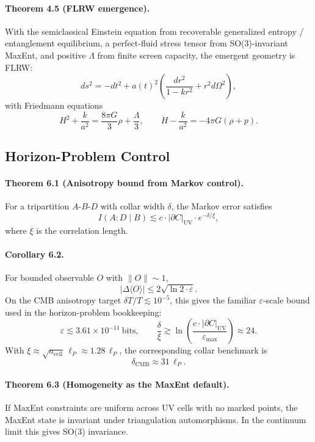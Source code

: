 \paragraph{\textbf{Theorem 4.5 (FLRW emergence).}}
With the semiclassical Einstein equation from recoverable generalized entropy / entanglement
equilibrium, a perfect-fluid stress tensor from SO(3)-invariant MaxEnt, and positive \(\Lambda\)
from finite screen capacity, the emergent geometry is FLRW:
\[
ds^2=-dt^2+a(t)^2\left(\frac{dr^2}{1-kr^2}+r^2d\Omega^2\right),
\]
with Friedmann equations
\[
H^2+\frac{k}{a^2}=\frac{8\pi G}{3}\rho+\frac{\Lambda}{3},
\qquad
\dot H-\frac{k}{a^2}=-4\pi G(\rho+p).
\]

\subsection{Horizon-Problem Control}

\paragraph{\textbf{Theorem 6.1 (Anisotropy bound from Markov control).}}
For a tripartition \(A\)-\(B\)-\(D\) with collar width \(\delta\), the Markov error satisfies
\[
I(A:D\mid B)\lesssim c\cdot |\partial C|_{\mathrm{UV}}\cdot e^{-\delta/\xi},
\]
where \(\xi\) is the correlation length.

\paragraph{\textbf{Corollary 6.2.}}
For bounded observable \(O\) with \(\|O\|\sim1\),
\[
|\Delta\langle O\rangle|\le 2\sqrt{\ln 2\cdot \varepsilon}.
\]
On the CMB anisotropy target \(\delta T/T\lesssim 10^{-5}\), this gives the familiar
\(\varepsilon\)-scale bound used in the horizon-problem bookkeeping:
\[
\varepsilon\lesssim 3.61\times 10^{-11}\ \text{bits},
\qquad
\frac{\delta}{\xi}\gtrsim
\ln\!\left(\frac{c\cdot |\partial C|_{\mathrm{UV}}}{\varepsilon_{\max}}\right)\approx 24.
\]
With \(\xi\approx \sqrt{a_{\mathrm{cell}}}\,\ell_P\approx 1.28\,\ell_P\), the corresponding collar
benchmark is
\[
\delta_{\mathrm{CMB}}\approx 31\,\ell_P.
\]

\paragraph{\textbf{Theorem 6.3 (Homogeneity as the MaxEnt default).}}
If MaxEnt constraints are uniform across UV cells with no marked points, the MaxEnt state is
invariant under triangulation automorphisms. In the continuum limit this gives SO(3) invariance.

